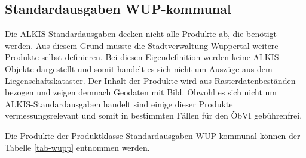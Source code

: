 \subsection{Standardausgaben WUP-kommunal}

Die ALKIS-Standardausgaben decken nicht alle Produkte ab, die benötigt werden. Aus diesem Grund musste die Stadtverwaltung Wuppertal weitere Produkte selbst definieren.
Bei diesen Eigendefinition werden keine ALKIS-Objekte dargestellt und somit handelt es sich nicht um Auszüge aus dem Liegenschaftskataster.
Der Inhalt der Produkte wird aus Rasterdatenbeständen bezogen und zeigen demnach Geodaten mit Bild.
Obwohl es sich nicht um ALKIS-Standardausgaben handelt sind einige dieser Produkte vermessungsrelevant und somit in bestimmten Fällen für den ÖbVI gebührenfrei.

Die Produkte der Produktklasse Standardausgaben WUP-kommunal können der Tabelle \ref{tab-wupp} entnommen werden.


